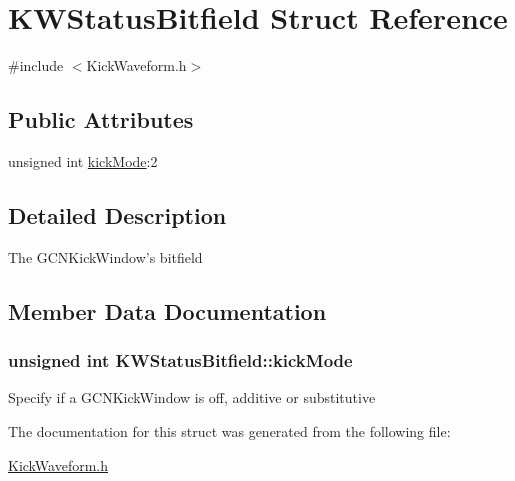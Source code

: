 \hypertarget{structKWStatusBitfield}{
\section{KWStatusBitfield Struct Reference}
\label{structKWStatusBitfield}
}


{\ttfamily \#include $<$KickWaveform.h$>$}

\subsection*{Public Attributes}
\begin{DoxyCompactItemize}
\item 
unsigned int \hyperlink{structKWStatusBitfield_a75cbbaa8beb9ceed559a03c13c04803b}{kickMode}:2
\end{DoxyCompactItemize}


\subsection{Detailed Description}
The GCNKickWindow's bitfield 

\subsection{Member Data Documentation}
\hypertarget{structKWStatusBitfield_a75cbbaa8beb9ceed559a03c13c04803b}{
\subsubsection[{kickMode}]{\setlength{\rightskip}{0pt plus 5cm}unsigned int {\bf KWStatusBitfield::kickMode}}}
\label{structKWStatusBitfield_a75cbbaa8beb9ceed559a03c13c04803b}
Specify if a GCNKickWindow is off, additive or substitutive 

The documentation for this struct was generated from the following file:\begin{DoxyCompactItemize}
\item 
\hyperlink{KickWaveform_8h}{KickWaveform.h}\end{DoxyCompactItemize}

